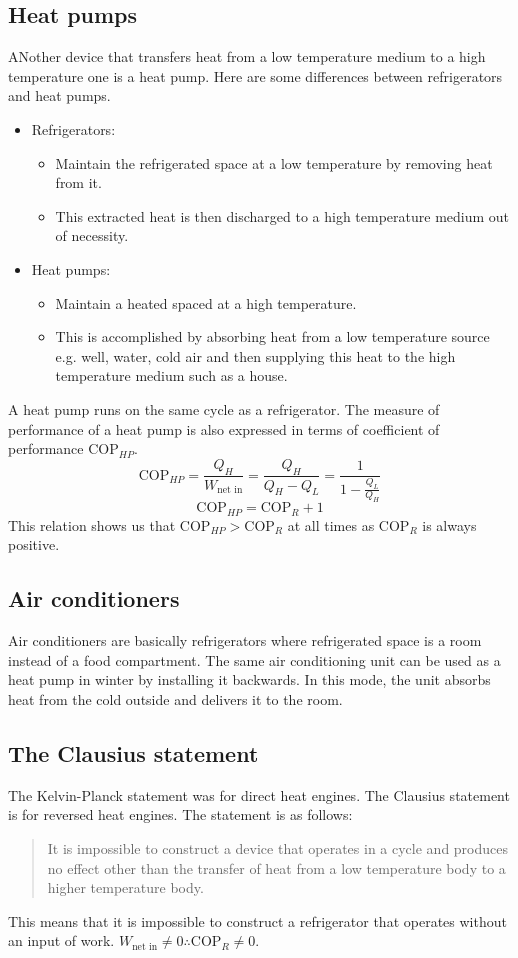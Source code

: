 \documentclass[class=report, crop=false, 12pt,a4paper]{standalone}
\begin{document}
\subsection{Heat pumps}
ANother device that transfers heat from a low temperature medium to a high temperature one is a heat pump. 
Here are some differences between refrigerators and heat pumps.
\begin{itemize}[noitemsep]
  \item Refrigerators:
  \begin{itemize}
    \item Maintain the refrigerated space at a low temperature by removing heat from it.
    \item This extracted heat is then discharged to a high temperature medium out of necessity.
  \end{itemize}
  \item Heat pumps:
  \begin{itemize}
    \item Maintain a heated spaced at a high temperature.
    \item This is accomplished by absorbing heat from a low temperature source e.g. well, water, cold air and then supplying this heat to the high temperature medium such as a house.
  \end{itemize}
\end{itemize}
A heat pump runs on the same cycle as a refrigerator. The measure of performance of a heat pump is also expressed in terms of coefficient of performance \(\textrm{COP}_{HP}\).
\[ \textrm{COP}_{HP} = \frac{Q_H}{W_{\textrm{net in}}} = \frac{Q_H}{Q_H - Q_L} = \frac{1}{1 - \frac{Q_L}{Q_H}} \]
\[ \textrm{COP}_{HP} = \textrm{COP}_R + 1 \]
This relation shows us that $\textrm{COP}_{HP} > \textrm{COP}_R$ at all times as $\textrm{COP}_R$ is always positive.
\subsection{Air conditioners}
Air conditioners are basically refrigerators where refrigerated space is a room instead of a food compartment. The same air conditioning unit can be used as a heat pump in winter by installing it backwards. In this mode, the unit absorbs heat from the cold outside and delivers it to the room.
\subsection{The Clausius statement}
The Kelvin-Planck statement was for direct heat engines. The Clausius statement is for reversed heat engines. The statement is as follows:
\begin{quote}
  \begin{center}
    It is impossible to construct a device that operates in a cycle and produces no effect other than the transfer of heat from a low temperature body to a higher temperature body.
  \end{center}
\end{quote}
This means that it is impossible to construct a refrigerator that operates without an input of work. \(W_{\textrm{net in}} \neq 0 \therefore \textrm{COP}_R \neq 0\).
\end{document}
